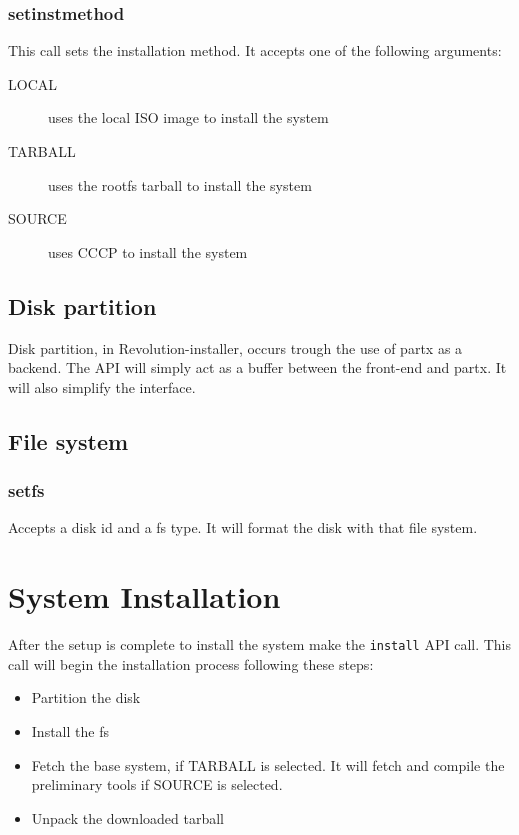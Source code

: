 \documentclass{scrartcl}
\begin{document}
\subsubsection{setinstmethod}
This call sets the installation method. It accepts one of the following
arguments:
\begin{description}
    \item[LOCAL] uses the local ISO image to install the system
    \item[TARBALL] uses the rootfs tarball to install the system
    \item[SOURCE] uses CCCP to install the system
\end{description}

\subsection{Disk partition}
Disk partition, in Revolution-installer, occurs trough the use of partx as a
backend. The API will simply act as a buffer between the front-end and partx.
It will also simplify the interface.

\subsection{File system}
\subsubsection{setfs}
Accepts a disk id and a fs type. It will format the disk with that file system.

\section{System Installation}
After the setup is complete to install the system make the \texttt{install}
API call. This call will begin the installation process following these steps:
\begin{itemize}
    \item Partition the disk
    \item Install the fs
    \item Fetch the base system, if TARBALL is selected. It will fetch and
        compile the preliminary tools if SOURCE is selected.
    \item Unpack the downloaded tarball
\end{itemize}
\end{document}
